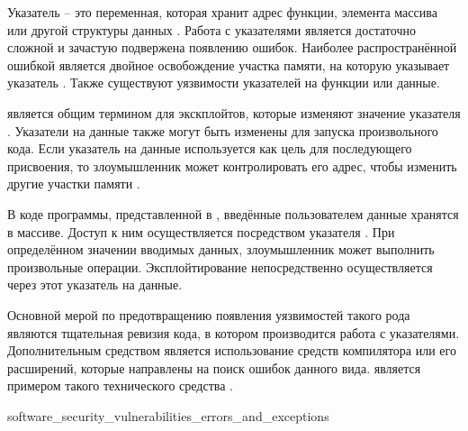 

%
Указатель -- это переменная, которая хранит адрес функции, элемента массива или другой структуры данных . 
%
Работа с указателями является достаточно сложной и зачастую подвержена появлению ошибок. 
%
Наиболее распространённой ошибкой является двойное освобождение участка памяти, на которую указывает указатель . 
%
Также существуют уязвимости указателей на функции или данные.

%
 является общим термином для экскплойтов, которые изменяют значение указателя . 
%
Указатели на данные также могут быть изменены для запуска произвольного кода. 
%
Если указатель на данные используется как цель для последующего присвоения, то злоумышленник может контролировать его адрес, чтобы изменить другие участки памяти . 

%
В коде программы, представленной в , введённые пользователем данные хранятся в массиве.
%
Доступ к ним осуществляется посредством указателя . 
%
При определённом значении вводимых данных, злоумышленник может выполнить произвольные операции. 
%
Эксплойтирование непосредственно осуществляется через этот указатель на данные.

%
Основной мерой по предотвращению появления уязвимостей такого рода являются тщательная ревизия кода, в котором производится работа с указателями. 
%
Дополнительным средством является использование средств компилятора или его расширений, которые направлены на поиск ошибок данного вида. 
%
 является примером такого технического средства . 


	{software_security_vulnerabilities_errors_and_exceptions}

